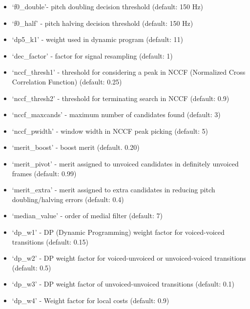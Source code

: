 \documentclass[letterpaper,10pt,english]{sphinxmanual}
\begin{document}
\begin{itemize}
\item {} 
`f0\_double'- pitch doubling decision threshold (default: 150 Hz)

\item {} 
`f0\_half' - pitch halving decision threshold (default: 150 Hz)

\item {} 
`dp5\_k1' - weight used in dynamic program (default: 11)

\item {} 
`dec\_factor' - factor for signal resampling (default: 1)

\item {} 
`nccf\_thresh1' - threshold for considering a peak in NCCF (Normalized Cross Correlation Function) (default: 0.25)

\item {} 
`nccf\_thresh2' - threshold for terminating search in NCCF (default: 0.9)

\item {} 
`nccf\_maxcands' - maximum number of candidates found (default: 3)

\item {} 
`nccf\_pwidth' - window width in NCCF peak picking (default: 5)

\item {} 
`merit\_boost' - boost merit (default. 0.20)

\item {} 
`merit\_pivot' - merit assigned to unvoiced candidates in definitely unvoiced frames (default: 0.99)

\item {} 
`merit\_extra' - merit assigned to extra candidates in reducing pitch doubling/halving errors (default: 0.4)

\item {} 
`median\_value' - order of medial filter (default: 7)

\item {} 
`dp\_w1' - DP (Dynamic Programming) weight factor for voiced-voiced transitions (default: 0.15)

\item {} 
`dp\_w2' - DP weight factor for voiced-unvoiced or unvoiced-voiced transitions (default: 0.5)

\item {} 
`dp\_w3' - DP weight factor of unvoiced-unvoiced transitions (default: 0.1)

\item {} 
`dp\_w4' - Weight factor for local costs (default: 0.9)

\end{itemize}
\end{document}
